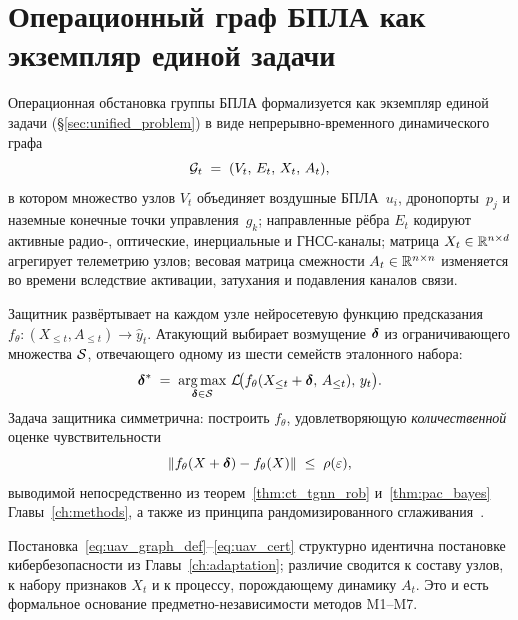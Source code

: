 \section{Операционный граф БПЛА как экземпляр единой задачи}
\label{sec:uav_graph}

Операционная обстановка группы БПЛА формализуется как экземпляр
единой задачи (\S\ref{sec:unified_problem})
в виде непрерывно-временного динамического графа
\begin{equation}
\mathcal{G}_t \;=\; (V_t,\,E_t,\,X_t,\,A_t),
\label{eq:uav_graph_def}
\end{equation}
в котором множество узлов $V_t$ объединяет воздушные БПЛА~$u_i$,
дронопорты~$p_j$ и наземные конечные точки управления~$g_k$; направленные
рёбра $E_t$ кодируют активные радио-, оптические, инерциальные и
ГНСС-каналы; матрица $X_t \in \mathbb{R}^{n\times d}$ агрегирует телеметрию узлов;
весовая матрица смежности $A_t \in \mathbb{R}^{n\times n}$ изменяется во времени
вследствие активации, затухания и подавления каналов связи.

Защитник развёртывает на каждом узле нейросетевую функцию предсказания
$f_{\theta}\colon (X_{\le t},A_{\le t}) \to \hat{y}_t$. Атакующий выбирает
возмущение $\boldsymbol{\delta}$ из ограничивающего множества $\mathcal{S}$, отвечающего
одному из шести семейств эталонного набора:
\begin{equation}
\boldsymbol{\delta}^{*} \;=\; \mathop{\mathrm{arg\,max}}_{\boldsymbol{\delta}\in\mathcal{S}}\,
\mathcal{L}\!\bigl(f_{\theta}(X_{\le t}+\boldsymbol{\delta},\,A_{\le t}),\,y_t\bigr).
\label{eq:uav_adv_max}
\end{equation}
Задача защитника симметрична: построить $f_{\theta}$, удовлетворяющую
\emph{количественной} оценке чувствительности
\begin{equation}
\left\lVert f_{\theta}(X+\boldsymbol{\delta}) - f_{\theta}(X)\right\rVert \;\le\; \rho(\varepsilon),
\label{eq:uav_cert}
\end{equation}
выводимой непосредственно из теорем~\ref{thm:ct_tgnn_rob} и~\ref{thm:pac_bayes} Главы~\ref{ch:methods}, а также из принципа рандомизированного сглаживания~\cite{Cohen2019}.

Постановка~\eqref{eq:uav_graph_def}--\eqref{eq:uav_cert} структурно
идентична постановке кибербезопасности из Главы~\ref{ch:adaptation}; различие
сводится к составу узлов, к набору признаков $X_t$ и к процессу,
порождающему динамику $A_t$. Это и есть формальное основание
предметно-независимости методов \textsf{M1}--\textsf{M7}.


